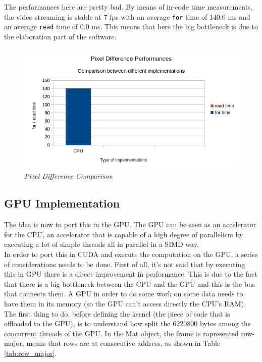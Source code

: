 \documentclass[paper=a4, fontsize=10pt]{scrartcl}	%
\begin{document}
	The performances here are pretty bad. By means of in-code time measurements, the video streaming is stable at 7 fps with an average \texttt{for} time of 140.0 ms and an average \texttt{read} time of 0.0 ms. This means that here the big bottleneck is due to the elaboration part of the software.

	\begin{figure}[H]
		\centering
		\includegraphics[width=0.8\linewidth]{images/chart1.png}
		\caption{\textit{Pixel Difference Comparison}}
	\end{figure}

	\subsection{GPU Implementation}
	\label{sec:gpu-implementation}
	The idea is now to port this in the GPU. The GPU can be seen as an accelerator for the CPU, an accelerator that is capable of a high degree of parallelism by executing a lot of simple threads all in parallel in a SIMD way.\\

	In order to port this in CUDA and execute the computation on the GPU, a series of considerations needs to be done. First of all, it's not said that by executing this in GPU there is a direct improvement in performance. This is due to the fact that there is a big bottleneck between the CPU and the GPU and this is the bus that connects them. A GPU in order to do some work on some data needs to have them in its memory (so the GPU can't access directly the CPU's RAM).\\

	The first thing to do, before defining the kernel (the piece of code that is offloaded to the GPU), is to understand how split the 6220800 bytes among the concurrent threads of the GPU. In the Mat object, the frame is rapresented row-major, means that rows are at consecutive address, as shown in Table \ref{tab:row_major}.
\end{document}

